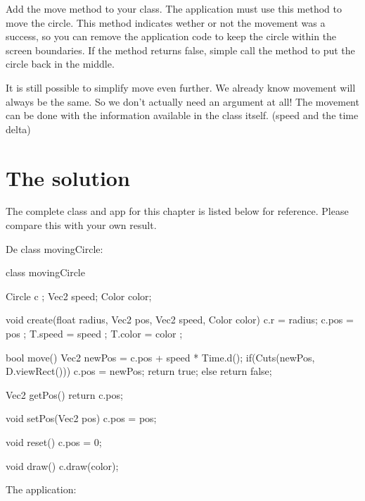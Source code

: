 \begin{exercise}
Add the move method to your class. The application must use this method to move the circle. This method indicates wether or not the movement was a success, so you can remove the application code to keep the circle within the screen boundaries. If the method returns false, simple call the  method to put the circle back in the middle.

It is still possible to simplify move even further. We already know movement will always be the same. So we don't actually need an argument at all! The movement can be done with the information available in the class itself. (speed and the time delta)
\end{exercise}

\section{The solution}
The complete class and app for this chapter is listed below for reference. Please compare this with your own result.

De class movingCircle:
\begin{code}
class movingCircle
{
   Circle c    ;
   Vec2   speed;
   Color  color;
   
   void create(float radius, Vec2 pos, Vec2 speed, Color color)
   {
      c.r     = radius;
      c.pos   = pos   ;
      T.speed = speed ;
      T.color = color ;
   }
   
   bool move()
   {
      Vec2 newPos = c.pos + speed * Time.d();
      if(Cuts(newPos, D.viewRect()))
      {
         c.pos = newPos;
         return true;
      } else return false;
   }
   
   Vec2 getPos()
   {
      return c.pos;
   }
   
   void setPos(Vec2 pos)
   {
      c.pos = pos;
   }
   
   void reset()
   {
      c.pos = 0;
   }
   
   void draw()
   {
      c.draw(color);
   }
}
\end{code}

The application:

